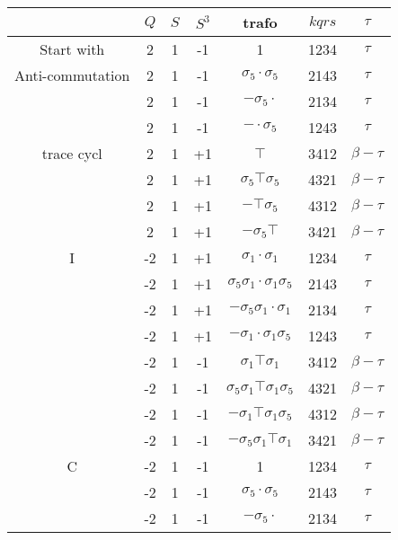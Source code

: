 \begin{table}[h]
  \centering
  \begin{tabular}{c|cccccc}
                    & $Q$ & $S$ & $S^3$ & trafo & $kqrs$    & $\tau$  \\
                    \hline
  Start with        & 2 & 1 & -1 & 1 & 1234 &  $\tau$  \\
  \hline
  Anti-commutation  & 2 & 1 & -1 & $\sigma_5\cdot\sigma_5$ & 2143 &  $\tau$  \\
                    & 2 & 1 & -1 & $-\sigma_5\cdot$ & 2134 &  $\tau$  \\
                    & 2 & 1 & -1 & $-\cdot\sigma_5$ & 1243 &  $\tau$  \\
  \hline
  trace cycl        & 2 & 1 & +1 & $\top$ & 3412 &  $\beta-\tau$  \\
                    & 2 & 1 & +1 & $\sigma_5\top\sigma_5$ & 4321 &  $\beta-\tau$  \\
                    & 2 & 1 & +1 & $-\top\sigma_5$ & 4312 &  $\beta-\tau$  \\
                    & 2 & 1 & +1 & $-\sigma_5\top$ & 3421 &  $\beta-\tau$  \\
  \hline
  I                 & -2 & 1 & +1 & $\sigma_1\cdot\sigma_1$ & 1234 &  $\tau$  \\
                    & -2 & 1 & +1 & $\sigma_5\sigma_1\cdot\sigma_1\sigma_5$ & 2143 &  $\tau$  \\
                    & -2 & 1 & +1 & $-\sigma_5\sigma_1\cdot\sigma_1$ & 2134 &  $\tau$  \\
                    & -2 & 1 & +1 & $-\sigma_1\cdot\sigma_1\sigma_5$ & 1243 &  $\tau$  \\
                    & -2 & 1 & -1 & $\sigma_1\top\sigma_1$ & 3412 &  $\beta-\tau$  \\
                    & -2 & 1 & -1 & $\sigma_5\sigma_1\top\sigma_1\sigma_5$ & 4321 &  $\beta-\tau$  \\
                    & -2 & 1 & -1 & $-\sigma_1\top\sigma_1\sigma_5$ & 4312 &  $\beta-\tau$  \\
                    & -2 & 1 & -1 & $-\sigma_5\sigma_1\top\sigma_1$ & 3421 &  $\beta-\tau$  \\
  \hline\hline
  C                 & -2 & 1 & -1 & 1 & 1234 &  $\tau$  \\
                    & -2 & 1 & -1 & $\sigma_5\cdot\sigma_5$ & 2143 &  $\tau$  \\
                    & -2 & 1 & -1 & $-\sigma_5\cdot$ & 2134 &  $\tau$  \\

\end{tabular}
\end{table}

